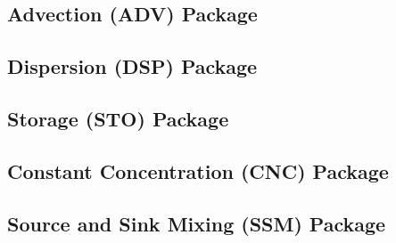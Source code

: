 \subsection{Advection (ADV) Package}


\newpage
\subsection{Dispersion (DSP) Package}


\newpage
\subsection{Storage (STO) Package}


\newpage
\subsection{Constant Concentration (CNC) Package}


\newpage
\subsection{Source and Sink Mixing (SSM) Package}


%

